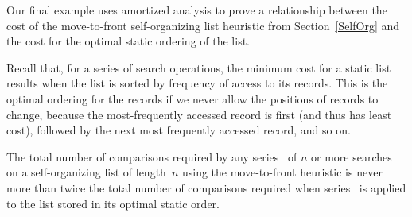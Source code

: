 Our final example uses amortized analysis to prove a relationship
between the cost of the move-to-front self-organizing list heuristic
from Section~\ref{SelfOrg} and the cost for the optimal static
ordering of the list.

Recall that, for a series of search operations, the minimum cost for a
static list results when the list is sorted by
frequency of access to its records.
This is the optimal ordering for the records if we never allow the
positions of records to change, because the most-frequently accessed
record is first (and thus has least cost), followed by the next most
frequently accessed record, and so on.

\begin{theorem}
\label{MTFThm}
The total number of comparisons required by any series~ of $n$
or more searches on a self-organizing list of length~$n$ using the
move-to-front heuristic is never more than twice the total number of
comparisons required when series~ is applied to the list
stored in its optimal static order.
\end{theorem}

